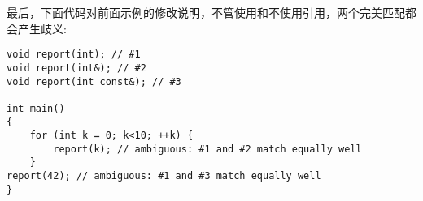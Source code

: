 最后，下面代码对前面示例的修改说明，不管使用和不使用引用，两个完美匹配都会产生歧义:

\begin{lstlisting}[style=styleCXX]
void report(int); // #1
void report(int&); // #2
void report(int const&); // #3

int main()
{
	for (int k = 0; k<10; ++k) {
		report(k); // ambiguous: #1 and #2 match equally well
	}
report(42); // ambiguous: #1 and #3 match equally well
}
\end{lstlisting}








